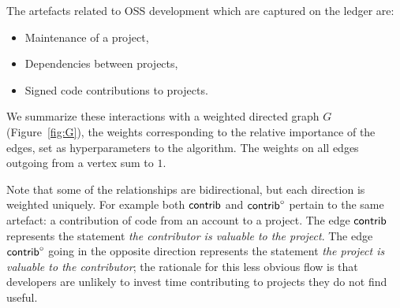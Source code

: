 The artefacts related to OSS development which are captured on the \oscoin{}
ledger are:
\begin{itemize}
  \item Maintenance of a project,
  \item Dependencies between projects,
  \item Signed code contributions to projects.
\end{itemize}
We summarize these interactions with a weighted directed graph $G$
(Figure~\ref{fig:G}), the weights corresponding to the relative importance of
the edges, set as hyperparameters to the algorithm.  The weights on all
edges outgoing from a vertex sum to $1$.

\begin{center}
\end{center}
\medskip


\noindent Note that some of the relationships are bidirectional, but each direction is
weighted uniquely. For example both $\mathsf{contrib}$ and $\mathsf{contrib}^\circ$ pertain to
the same artefact: a contribution of code from an account to a
project. The edge $\mathsf{contrib}$ represents the statement \emph{the contributor
is valuable to the project}. The edge $\mathsf{contrib}^\circ$ going in the
opposite direction represents the statement \emph{the project is
valuable to the contributor}; the rationale for this less obvious flow is
that developers are unlikely to invest time contributing to projects they
do not find useful.


